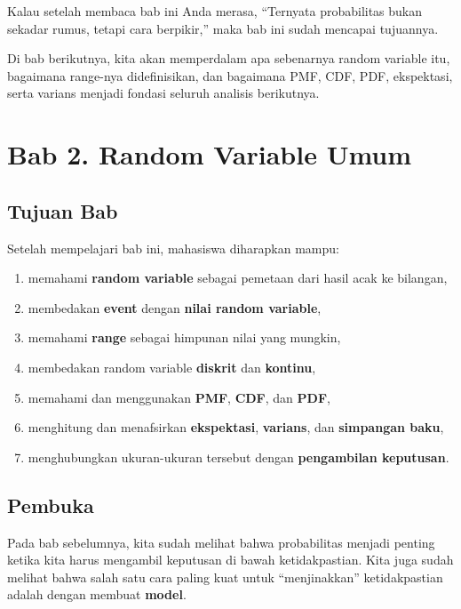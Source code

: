 \documentclass[
  letterpaper,
  DIV=11,
  numbers=noendperiod]{scrreprt}
\providecommand{\tightlist}{%
  \setlength{\itemsep}{0pt}\setlength{\parskip}{0pt}}
\begin{document}
Kalau setelah membaca bab ini Anda merasa, ``Ternyata probabilitas bukan
sekadar rumus, tetapi cara berpikir,'' maka bab ini sudah mencapai
tujuannya.

Di bab berikutnya, kita akan memperdalam apa sebenarnya random variable
itu, bagaimana range-nya didefinisikan, dan bagaimana PMF, CDF, PDF,
ekspektasi, serta varians menjadi fondasi seluruh analisis berikutnya.


\chapter{Bab 2. Random Variable Umum}\label{bab-2.-random-variable-umum}

\section{Tujuan Bab}\label{tujuan-bab-1}

Setelah mempelajari bab ini, mahasiswa diharapkan mampu:

\begin{enumerate}
\def\labelenumi{\arabic{enumi}.}
\tightlist
\item
  memahami \textbf{random variable} sebagai pemetaan dari hasil acak ke
  bilangan,
\item
  membedakan \textbf{event} dengan \textbf{nilai random variable},
\item
  memahami \textbf{range} sebagai himpunan nilai yang mungkin,
\item
  membedakan random variable \textbf{diskrit} dan \textbf{kontinu},
\item
  memahami dan menggunakan \textbf{PMF}, \textbf{CDF}, dan \textbf{PDF},
\item
  menghitung dan menafsirkan \textbf{ekspektasi}, \textbf{varians}, dan
  \textbf{simpangan baku},
\item
  menghubungkan ukuran-ukuran tersebut dengan \textbf{pengambilan
  keputusan}.
\end{enumerate}

\section{Pembuka}\label{pembuka-1}

Pada bab sebelumnya, kita sudah melihat bahwa probabilitas menjadi
penting ketika kita harus mengambil keputusan di bawah ketidakpastian.
Kita juga sudah melihat bahwa salah satu cara paling kuat untuk
``menjinakkan'' ketidakpastian adalah dengan membuat \textbf{model}.
\end{document}
